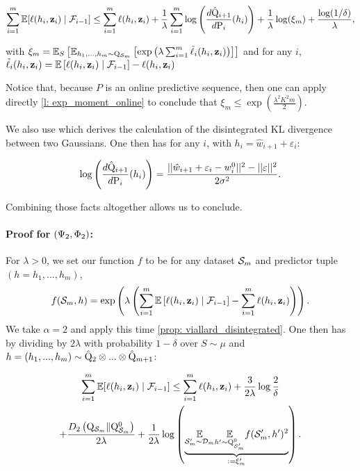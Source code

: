 \[ \sum_{i=1}^m  \mathbb{E}[\ell(h_i,\mathbf{z}_i) \mid \mathcal{F}_{i-1}]   \leq \sum_{i=1}^m  \ell(h_i,\mathbf{z}_i)  + \frac{1}{\lambda}\sum_{i=1}^m \log\left(\frac{d\hat{\mathrm{Q}}_{i+1}}{d\mathrm{P}_{i}}(h_i)\right) + \frac{1}{\lambda} \log(\xi_m) + \frac{\log(1/\delta)}{\lambda}, \]

with $  \xi_m = \mathbb{E}_S\left[\mathbb{E}_{h_1,...,h_m \sim \mathrm{Q}_{\mathcal{S}_m}} \left[\exp\left(\lambda \sum_{i=1}^m \Tilde{\ell}_i(h_i,\mathbf{z}_i)\right)\right]\right]$ and for any $i$,
$ \Tilde{\ell}_i(h_i,\mathbf{z}_i) = \mathbb{E}\left[\ell(h_i,\mathbf{z}_i)\mid \mathcal{F}_{i-1}\right]-  \ell(h_i,\mathbf{z}_i) $

Notice that, because $P$ is an online predictive sequence, then one can apply directly \cref{l: exp_moment_online} to conclude that $\xi_m \leq \exp \left( \frac{\lambda^2K^2m}{2} \right)$.

We also use \cite[Lemma 11]{viallard2023general} which derives the calculation of the disintegrated KL divergence between two Gaussians. One then has for any $i$, with $h_i= \hat{w}_{i+1} + \varepsilon_i$:

\[ \log\left(\frac{d\hat{\mathrm{Q}}_{i+1}}{d\mathrm{P}_{i}}(h_i)\right) = \frac{||\hat{w}_{i+1} + \varepsilon_i- w_i^0||^2 - ||\varepsilon||^2}{2\sigma^2}. \]

Combining those facts altogether allows us to conclude.


\paragraph{Proof for  $(\Psi_{\normalfont2},\Phi_{\normalfont2})$:}

For $\lambda>0$, we set our function $f$ to be for any dataset $\mathcal{S}_m$ and predictor tuple $(h=h_1,...,h_m)$,
\[f(\mathcal{S}_m,h) = \exp\left(\lambda \left(\sum_{i=1}^m \mathbb{E}\left[\ell(h_i,\mathbf{z}_i)\mid \mathcal{F}_{i-1}\right]- \sum_{i=1}^m \ell(h_i,\mathbf{z}_i) \right) \right).\]
We take $\alpha=2$ and apply this time \cref{prop: viallard_disintegrated}.
One then has by dividing by $2\lambda$ with probability $1-\delta$ over $S\sim \mu$ and $h=(h_1,...,h_m)\sim \hat{\mathrm{Q}}_2\otimes ... \otimes \hat{\mathrm{Q}}_{m+1}$:

\begin{multline*}\sum_{i=1}^m  \mathbb{E}[\ell(h_i,\mathbf{z}_i) \mid \mathcal{F}_{i-1}]   \leq \sum_{i=1}^m  \ell(h_i,\mathbf{z}_i)+   \frac{3}{2\lambda}\log \frac{2}{\delta}\\
  +\frac{D_{2}\left(\mathrm{Q}_{\mathcal{S}_m} \| \mathrm{Q}_{\mathcal{S}_m}^0\right)}{2\lambda}+ \frac{1}{2\lambda}
\log \left(\underbrace{\underset{\mathcal{S}_m^{\prime} \sim \mathcal{D}_{m}}{\mathbb{E}} \underset{h^{\prime} \sim \mathrm{Q}_{\mathcal{S}_m'}^0}{\mathbb{E}}
f(\mathcal{S}_m',h')^{2}}_{:= \xi_m'}\right). 
\end{multline*}

